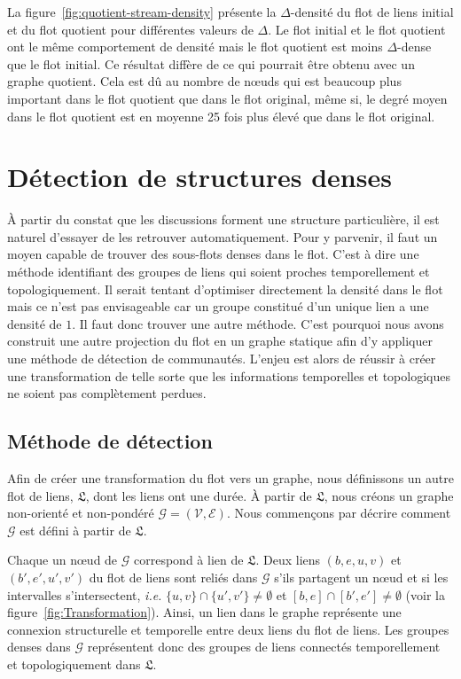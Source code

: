 La figure~\ref{fig:quotient-stream-density} présente la $\Delta$-densité du flot de liens initial et du flot quotient pour différentes valeurs de $\Delta$.
Le flot initial et le flot quotient ont le même comportement de densité mais le flot quotient est moins $\Delta$-dense que le flot initial.
Ce résultat diffère de ce qui pourrait être obtenu avec un graphe quotient.
Cela est dû au nombre de n\oe{}uds qui est beaucoup plus important dans le flot quotient que dans le flot original, même si, le degré moyen dans le flot quotient est en moyenne 25 fois plus élevé que dans le flot original.


\section{Détection de structures denses}

\`A partir du constat que les discussions forment une structure particulière, il est naturel d'essayer de les retrouver automatiquement. 
Pour y parvenir, il faut un moyen capable de trouver des sous-flots denses dans le flot.
C'est à dire une méthode identifiant des groupes de liens qui soient proches temporellement et topologiquement.
Il serait tentant d'optimiser directement la densité dans le flot mais ce n'est pas envisageable car un groupe constitué d'un unique lien a une densité de $1$.
Il faut donc trouver une autre méthode.
C'est pourquoi nous avons construit une autre projection du flot en un graphe statique afin d'y appliquer une méthode de détection de communautés.
L'enjeu est alors de réussir à créer une transformation de telle sorte que les informations temporelles et topologiques ne soient pas complètement perdues.

\subsection{Méthode de détection}
\label{sec:fail_mailing}
Afin de créer une transformation du flot vers un graphe, nous définissons un autre flot de liens, $\mathfrak{L}$, dont les liens ont une durée.
\`A partir de $\mathfrak{L}$, nous créons un graphe non-orienté et non-pondéré $\mathcal{G} = (\mathcal{V},\mathcal{E})$. Nous commençons par décrire comment $\mathcal{G}$ est défini à partir de $\mathfrak{L}$.

Chaque un n\oe{}ud de $\mathcal{G}$ correspond à lien de $\mathfrak{L}$.
Deux liens $(b,e,u,v)$ et $(b',e',u',v')$ du flot de liens sont reliés dans $\mathcal{G}$ s'ils partagent un n\oe{}ud et si les intervalles s'intersectent, \emph{i.e.} $\{u,v\} \cap \{u',v'\} \neq \emptyset$ et $[b,e]\cap[b',e'] \neq \emptyset$ (voir la figure~\ref{fig:Transformation}).
Ainsi, un lien dans le graphe représente une connexion structurelle et temporelle entre deux liens du flot de liens.
Les groupes denses dans $\mathcal{G}$ représentent donc des groupes de liens connectés temporellement et topologiquement dans $\mathfrak{L}$.

